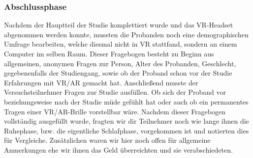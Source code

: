 \subsubsection{Abschlussphase}
Nachdem der Hauptteil der Studie komplettiert wurde und das VR-Headset abgenommen werden konnte, mussten die Probanden noch eine demographischen Umfrage bearbeiten, welche diesmal nicht in VR stattfand, sondern an einem Computer im selben Raum. 
Dieser Fragebogen besteht zu Beginn aus allgemeinen, anonymen Fragen zur Person, Alter des Probanden, Geschlecht, gegebenenfalls der Studiengang, sowie ob der Proband schon vor der Studie Erfahrungen mit VR/AR gemacht hat. 
Anschließend musste der Versuchsteilnehmer Fragen zur Studie ausfüllen. Ob sich der Proband vor beziehungsweise nach der Studie müde gefühlt hat oder auch ob ein permanentes Tragen einer VR/AR-Brille vorstellbar wäre.
Nachdem dieser Fragebogen vollständig ausgefüllt wurde, fragten wir dir Teilnehmer noch wie lange ihnen die Ruhephase, bzw. die eigentliche Schlafphase, vorgekommen ist und notierten dies für Vergleiche. Zusätzlichen waren wir hier noch offen für allgemeine Anmerkungen ehe wir ihnen das Geld überreichten und sie verabschiedeten.
